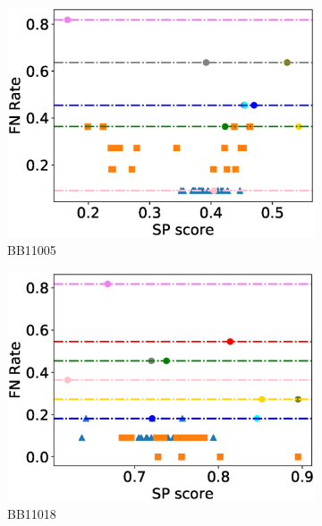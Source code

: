 \begin{figure}[!htbp]
\begin{adjustwidth}{-1cm}{-1cm}
\begin{subfigure}{0.26\textwidth}
			\includegraphics[width=\columnwidth]{Figure/summary/precomputedInit/Balibase/BB11005_fnrate_vs_sp_2}
			\caption{BB11005}
		\end{subfigure}    
		\begin{subfigure}{0.26\textwidth}
			\includegraphics[width=\columnwidth]{Figure/summary/precomputedInit/Balibase/BB11018_fnrate_vs_sp_2}
			\caption{BB11018}
		\end{subfigure}
		\begin{subfigure}{0.26\textwidth}

\end{subfigure}
\end{adjustwidth}
\end{figure}
